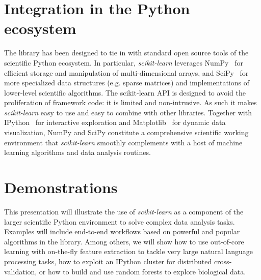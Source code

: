\documentclass{article}
\newcommand{\sklearn}{\textit{scikit-learn}\xspace}
\DeclareRobustCommand{\VAN}[3]{#2}
\begin{document}
\section*{Integration in the Python ecosystem}

The library has been designed to tie in with standard  open source tools of the
scientific Python ecosystem. In particular, \sklearn leverages
NumPy~\citep{vanderwalt2011} for efficient storage and manipulation of
multi-dimensional arrays, and SciPy~\citep{oliphant2007python} for more specialized
data structures  (e.g. sparse matrices) and implementations of lower-level
scientific algorithms. The scikit-learn API is designed to avoid the
proliferation of framework code: it is
limited and non-intrusive. As such it makes \sklearn easy to use and easy to
combine with other libraries. Together with IPython~\citep{perez2007ipython}
for interactive exploration and Matplotlib~\citep{hunter2007matplotlib} for
dynamic data visualization, NumPy and SciPy constitute a comprehensive
scientific working environment that \sklearn smoothly complements with a
host of machine learning algorithms and data analysis routines.


\section*{Demonstrations}

This presentation will illustrate the use of \sklearn as a component of the
larger scientific Python environment to solve complex data analysis tasks.
Examples will include end-to-end workflows based on powerful
and popular algorithms in the library. Among others, we will show how to use
out-of-core learning with on-the-fly feature extraction to 
tackle very large natural language processing tasks, how to
exploit an IPython cluster for distributed cross-validation, or how to build and
use random forests to explore biological data.


{\scriptsize

\DeclareRobustCommand{\VAN}[3]{#3}
\setlength{\bibsep}{1mm}

}
\end{document}
